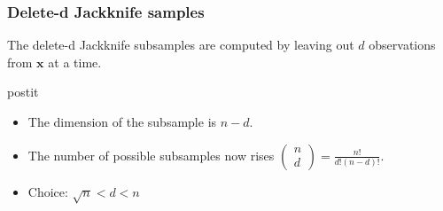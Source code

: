 \frame
{
\frametitle{Delete-d Jackknife samples}
\begin{definition}
The \alert{delete-d Jackknife} subsamples are computed by leaving out $d$ observations from $\mathbf{x}$ at a time.   
\end{definition}

\begin{beamercolorbox}[wd=\linewidth, rounded=true,shadow=true]{postit}
\begin{itemize}
\item The dimension of the subsample is  $n-d$.
\item The number of possible subsamples now rises $\left(\begin{array}{c}n \\ d\end{array}\right)
=\frac{n!}{d!(n-d)!}$.
 \item  Choice: $\sqrt{n}< d< n$
\end{itemize}
\end{beamercolorbox}



}
